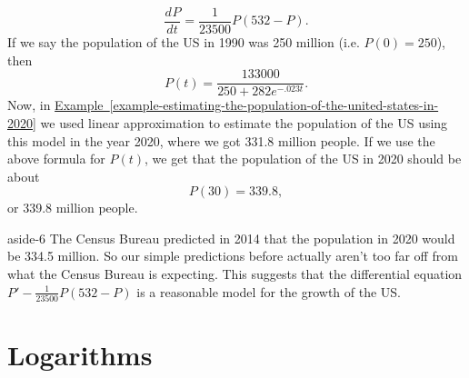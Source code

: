 \documentclass[10pt,]{book}
\numberwithin{equation}{section}
\newcommand{\dv}[3][]{\dfrac{d^{#1} #2}{d #3^{#1}}}
\begin{document}
\begin{equation*}
\dv{P}{t} = \frac{1}{23500}P(532 - P).
\end{equation*}
If we say the population of the US in 1990 was 250 million (i.e. \(P(0) = 250\)), then%
\begin{equation*}
P(t) = \frac{133000}{250 + 282e^{-.023t}}.
\end{equation*}
Now, in \hyperref[example-estimating-the-population-of-the-united-states-in-2020]{Example~\ref{example-estimating-the-population-of-the-united-states-in-2020}} we used linear approximation to estimate the population of the US using this model in the year 2020, where we got 331.8 million people. If we use the above formula for \(P(t)\), we get that the population of the US in 2020 should be about%
\begin{equation*}
P(30) = 339.8,
\end{equation*}
or 339.8 million people.%
\begin{aside}{}{aside-6}%
\hypertarget{p-197}{}%
The Census Bureau predicted in 2014 that the population in 2020 would be 334.5 million. So our simple predictions before actually aren't too far off from what the Census Bureau is expecting. This suggests that the differential equation \(P' - \frac{1}{23500}P(532-P)\) is a reasonable model for the growth of the US.%
\end{aside}
%
%
\typeout{************************************************}
\typeout{************************************************}
%
\section[{Logarithms}]{Logarithms}\label{section-logarithms}
%
%
\typeout{************************************************}
\typeout{************************************************}
%
\end{document}

